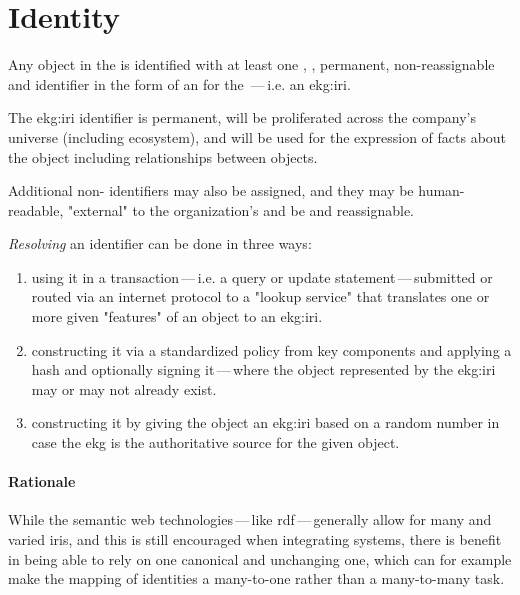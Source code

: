 \section{Identity}\label{sec:ekg-principles-identity}

Any object in the  is identified with at least one , ,
permanent, non-reassignable and  identifier in the form of an 
for the \,---\,i.e. an \gls{ekg:iri}.

The \gls{ekg:iri} identifier is permanent, will be proliferated across the company's universe (including ecosystem),
and will be used for the expression of facts about the object including relationships between objects.

Additional non- identifiers may also be assigned, and they may be human-readable,
"external" to the organization's  and be  and reassignable.

\textit{Resolving} an identifier can be done in three ways:

\begin{enumerate}
    \item using it in a transaction\,---\,i.e. a query or update statement\,---\,submitted or routed via an
          internet protocol to a "lookup service" that translates one or more given "features" of an
          object to an \gls{ekg:iri}.
    \item constructing it via a standardized policy from key components and applying a hash and optionally
          signing it\,---\,where the object represented by the \gls{ekg:iri} may or may not already exist.
    \item constructing it by giving the object an \gls{ekg:iri} based on a random number in case the \gls{ekg} is
          the authoritative source for the given object.
\end{enumerate}

\paragraph{Rationale}

While the semantic web technologies\,---\,like \gls{rdf}\,---\,generally allow for many and varied \glspl{iri},
and this is still encouraged when integrating systems, there is benefit in being able to rely on one canonical
and unchanging one, which can for example make the mapping of identities a many-to-one rather than a many-to-many task.

